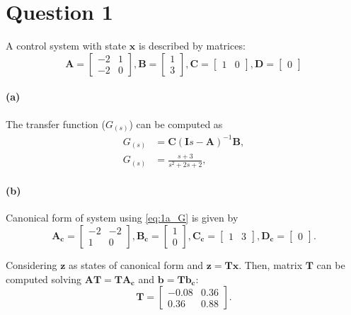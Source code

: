 \section{Question 1}
A control system with state $\mathbf{x}$ is described by matrices:
\begin{equation*}
\mathbf{A} =
\begin{bmatrix}
-2 & 1 \\ -2 & 0
\end{bmatrix},
\mathbf{B} =
\begin{bmatrix}
1 \\ 3
\end{bmatrix},
\mathbf{C} = 
\begin{bmatrix}
1 & 0
\end{bmatrix},
\mathbf{D} = 
\begin{bmatrix}
0
\end{bmatrix}
\end{equation*}

\paragraph{(a)} The transfer function ($G_{(s)}$) can be computed as
\begin{align}
	G_{(s)}&=\mathbf{C}(\mathbf{I}s-\mathbf{A})^{-1}\mathbf{B}, \nonumber \\
	G_{(s)}&= \frac{s+3}{s^2 + 2s + 2},
	\label{eq:1a_G}
\end{align}

\paragraph{(b)} Canonical form of system using \eqref{eq:1a_G} is given by
\begin{equation*}
\mathbf{A_c} =
\begin{bmatrix}
-2 & -2 \\ 1 & 0
\end{bmatrix},
\mathbf{B_c} =
\begin{bmatrix}
1 \\ 0
\end{bmatrix},
\mathbf{C_c} = 
\begin{bmatrix}
1 & 3
\end{bmatrix},
\mathbf{D_c} = 
\begin{bmatrix}
0
\end{bmatrix}.
\end{equation*}

Considering $\mathbf{z}$ as states of canonical form and $\mathbf{z}=\mathbf{T}\mathbf{x}$. Then, matrix $\mathbf{T}$ can be computed solving $\mathbf{A T} = \mathbf{T A_c}$ and $\mathbf{b} = \mathbf{T b_c}$:
\begin{equation*}
\mathbf{T} = 
\begin{bmatrix}
	-0.08 & 0.36 \\ 0.36 & 0.88
\end{bmatrix}.
\end{equation*}
 








